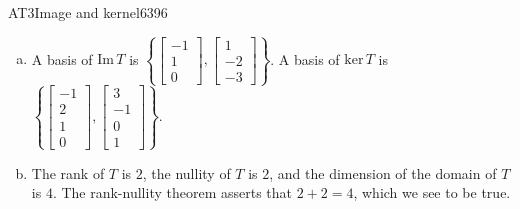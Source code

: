 \begin{exercise}{AT3}{Image and kernel}{6396}
\begin{exerciseAnswer}
\begin{enumerate}[(a)]
 
\item  

 A basis of \(\mathrm{Im}\,T\) is \(\left\{ \left[\begin{array}{c}
-1 \\
1 \\
0
\end{array}\right] , \left[\begin{array}{c}
1 \\
-2 \\
-3
\end{array}\right] \right\}\). A basis of \(\mathrm{ker}\,T\) is \(\left\{ \left[\begin{array}{c}
-1 \\
2 \\
1 \\
0
\end{array}\right] , \left[\begin{array}{c}
3 \\
-1 \\
0 \\
1
\end{array}\right] \right\}\). 

 
\item  

 The rank of \(T\) is \(2\), the nullity of \(T\) is \(2\), and the dimension of the domain of \(T\) is \(4\). The rank-nullity theorem asserts that \(2+2=4\), which we see to be true. 

 
\end{enumerate}

     \end{exerciseAnswer}
 \end{exercise}


